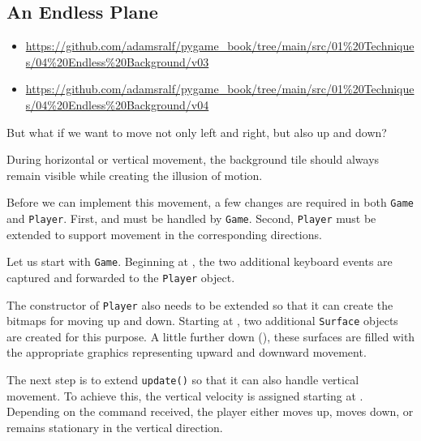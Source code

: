 \subsection{An Endless Plane}

\begin{diskbox}
	\begin{itemize}
	\item \url{https://github.com/adamsralf/pygame_book/tree/main/src/01%20Techniques/04%20Endless%20Background/v03}
	\item \url{https://github.com/adamsralf/pygame_book/tree/main/src/01%20Techniques/04%20Endless%20Background/v04}
\end{itemize}
\end{diskbox}

But what if we want to move not only left and right, but also up and down?

	During horizontal or vertical movement, the background tile should always remain visible while creating the illusion of motion.
\er

Before we can implement this movement, a few changes are required in both \texttt{Game} and \texttt{Player}. First, \keys{\arrowkeyup} and \keys{\arrowkeydown} must be handled by \texttt{Game}. Second, \texttt{Player} must be extended to support movement in the corresponding directions.

Let us start with \texttt{Game}. Beginning at , the two additional keyboard events are captured and forwarded to the \texttt{Player} object.


The constructor of \texttt{Player} also needs to be extended so that it can create the bitmaps for moving up and down. Starting at , two additional \texttt{Surface} objects are created for this purpose. A little further down (), these surfaces are filled with the appropriate graphics representing upward and downward movement.


The next step is to extend \texttt{update()} so that it can also handle vertical movement. To achieve this, the vertical velocity is assigned starting at . Depending on the command received, the player either moves up, moves down, or remains stationary in the vertical direction.

